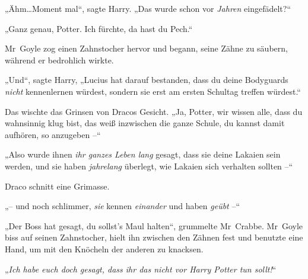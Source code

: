„Ähm…Moment mal“, sagte Harry. „Das wurde schon vor \emph{Jahren} eingefädelt?“

„Ganz genau, Potter. Ich fürchte, da hast du Pech.“

Mr~Goyle zog einen Zahnstocher hervor und begann, seine Zähne zu säubern, während er bedrohlich wirkte.

„Und“, sagte Harry, „Lucius hat darauf bestanden, dass du deine Bodyguards \emph{nicht} kennenlernen würdest, sondern sie erst am ersten Schultag treffen würdest.“

Das wischte das Grinsen von Dracos Gesicht. „Ja, Potter, wir wissen alle, dass du wahnsinnig klug bist, das weiß inzwischen die ganze Schule, du kannst damit aufhören, so anzugeben –“

„Also wurde ihnen \emph{ihr ganzes Leben lang} gesagt, dass sie deine Lakaien sein werden, und sie haben \emph{jahrelang} überlegt, wie Lakaien sich verhalten sollten –“

Draco schnitt eine Grimasse.

„– und noch schlimmer, \emph{sie} kennen \emph{einander} und haben \emph{geübt} –“

„Der Boss hat gesagt, du sollst’s Maul halten“, grummelte Mr~Crabbe. Mr~Goyle biss auf seinen Zahnstocher, hielt ihn zwischen den Zähnen fest und benutzte eine Hand, um mit den Knöcheln der anderen zu knacksen.

„\emph{Ich habe euch doch gesagt, dass ihr das nicht vor Harry Potter tun sollt!}“


